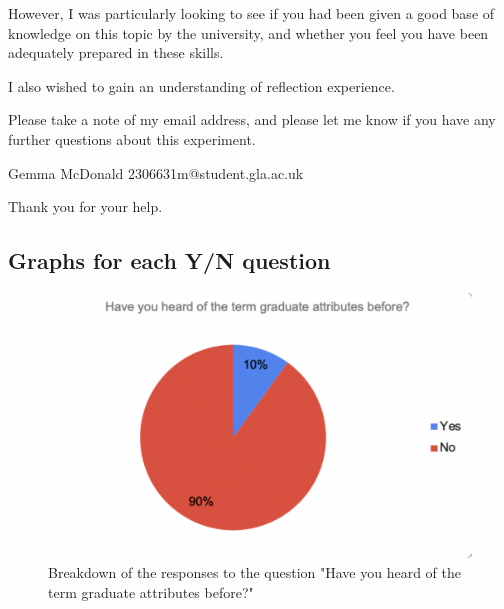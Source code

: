 \documentclass{l4proj}
\begin{document}
\begin{appendices}
However, I was particularly looking to see if you had been given a good base of knowledge on this topic by the university, and whether you feel you have been adequately prepared in these skills. 

I also wished to gain an understanding of reflection experience. 

Please take a note of my email address, and please let me know if you have any further questions about this experiment.

Gemma McDonald
2306631m@student.gla.ac.uk

Thank you for your help.


\subsection{Graphs for each Y/N question}

\begin{figure}[H]
    \begin{centering}
    \includegraphics[scale=0.5]{images/GradAttr-1.pdf}
    \caption{Breakdown of the responses to the question "Have you heard of the term graduate attributes before?"}
    \label{fig: GradAttr-1}
    \end{centering}
\end{figure}


\end{appendices}
\end{document}
